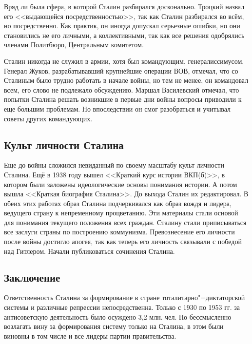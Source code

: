 Вряд ли была сфера, в которой Сталин разбирался досконально. Троцкий назвал его <<выдающейся посредственностью>>, так как Сталин разбирался во всём, но посредственно. Как практик, он иногда допускал серьезные ошибки, но они становились не его личными, а коллективными, так как все решения одобрялись членами Политбюро, Центральным комитетом.

Сталин никогда не служил в армии, хотя был командующим, генералиссимусом. Генерал Жуков, разрабатывавший крупнейшие операции ВОВ, отмечал, что со Сталиным было трудно работать в начале войны, но тем не менее, он командовал всем, его слово не подлежало обсуждению. Маршал Василевский отмечал, что попытки Сталина решать возникшие в первые дни войны вопросы приводили к еще большим проблемам. Но впоследствии он смог разобраться и учитывал советы других командующих.

\subsection{Культ личности Сталина}

Еще до войны сложился невиданный по своему масштабу культ личности Сталина. Ещё в 1938 году вышел <<Краткий курс истории ВКП(б)>>, в котором были заложены идеологические основы понимания истории. А потом вышла <<Краткая биография Сталина>>. До выхода Сталин их редактировал. В обеих этих работах образ Сталина подчеркивался как образ вождя и лидера, ведущего страну к непременному процветанию. Эти материалы стали основой для понимания текущего положения всех граждан. Сталину стали приписываться все заслуги страны по построению коммунизма. Превознесение его личности после войны достигло апогея, так как теперь его личность связывали с победой над Гитлером. Начали публиковаться сочинения Сталина.

\subsection{Заключение}

Ответственность Сталина за формирование в стране тоталитарно"=диктаторской системы и различные репрессии непосредственна. Только с 1930 по 1953 гг. за антисоветскую деятельность было осуждено 3,2 млн. чел. Но бессмысленно возлагать вину за формирования систему только на Сталина, в этом были виновны в том числе и все лидеры партии правительства.
